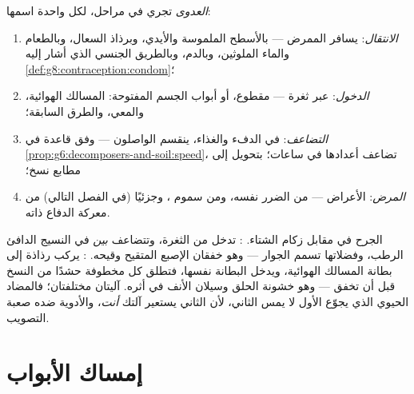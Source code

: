 \begin{definition}\label{def:g9:microbes-and-infection:stages}
\emph{العدوى} تجري في مراحل، لكل واحدة
اسمها:
\begin{enumerate}
  \item \emph{الانتقال}: يسافر الممرض --- بالأسطح
        الملموسة والأيدي، وبرذاذ السعال، وبالطعام والماء
        الملوثين، وبالدم، وبالطريق الجنسي الذي أشار إليه
        \cref{def:g8:contraception:condom}؛
  \item \emph{الدخول}: عبر ثغرة ---  مقطوع، أو أبواب
        الجسم المفتوحة: المسالك الهوائية، والمعي، والطرق
        السابقة؛
  \item \emph{التضاعف}: في الدفء  والغذاء، ينقسم
        الواصلون ---  وفق قاعدة  في
        \cref{prop:g6:decomposers-and-soil:speed}، تضاعف
        أعدادها في ساعات؛  بتحويل  إلى
        مطابع نسخ؛
  \item \emph{المرض}: الأعراض --- من الضرر نفسه، ومن
        سموم ، وجزئيًا (في الفصل التالي) من
        معركة الدفاع ذاته.
\end{enumerate}
\end{definition}

\begin{example}\label{ex:g9:microbes-and-infection:contrast}
 الجرح في مقابل  زكام الشتاء. :
تدخل من الثغرة، وتتضاعف \emph{بين}  في النسيج
الدافئ الرطب، وفضلاتها تسمم الجوار --- وهو خفقان الإصبع
المتقيح وقيحه. : يركب رذاذة إلى بطانة المسالك
الهوائية، ويدخل  البطانة نفسها، فتطلق كل 
مخطوفة حشدًا من النسخ قبل أن تخفق --- وهو خشونة الحلق
وسيلان الأنف في أثره. آليتان مختلفتان؛ فالمضاد الحيوي
الذي يجوّع الأول لا يمس الثاني، لأن الثاني يستعير آلتك
\emph{أنت}، والأدوية ضده صعبة التصويب.
\end{example}

\section{إمساك الأبواب}

